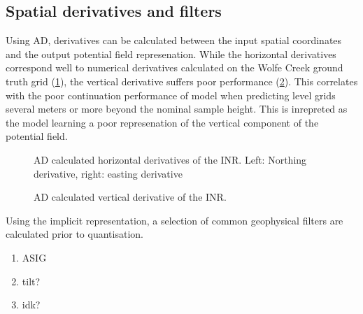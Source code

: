 \documentclass[manuscript.tex]{subfiles}
\begin{document}



\subsection{Spatial derivatives and filters}
Using AD, derivatives can be calculated between the input spatial coordinates and the output potential field represenation.
While the horizontal derivatives correspond well to numerical derivatives calculated on the Wolfe Creek ground truth grid (\cref{fig:hori_grad}), the vertical derivative suffers poor performance (\cref{fig:vert_grad}).
This correlates with the poor continuation performance of model when predicting level grids several meters or more beyond the nominal sample height.
This is inrepreted as the model learning a poor represenation of the vertical component of the potential field.

\begin{figure}[hbt]
    \caption[Horizontal derivatives]{AD calculated horizontal derivatives of the INR\@. Left: Northing derivative, right: easting derivative}
    \label{fig:hori_grad}
\end{figure}

\begin{figure}[hbt]
    \caption[Vertical derivative]{AD calculated vertical derivative of the INR.}
    \label{fig:vert_grad}
\end{figure}

Using the implicit representation, a selection of common geophysical filters are calculated prior to quantisation.

\begin{enumerate}
    \item ASIG
    \item tilt?
    \item idk?
\end{enumerate}
\end{document}
